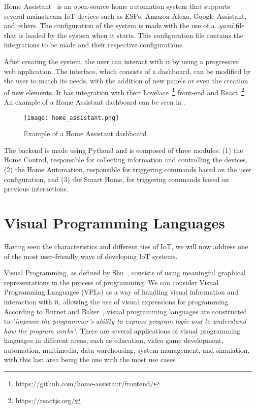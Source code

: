 Home Assistant~\cite{home_assistant} is an open-source home automation system that supports several mainstream IoT devices such as ESPs, Amazon Alexa, Google Assistant, and others. The configuration of the system is made with the use of a \textit{.yaml} file that is loaded by the system when it starts. This configuration file contains the integrations to be made and their respective configurations.

After creating the system, the user can interact with it by using a progressive web application. The interface, which consists of a dashboard, can be modified by the user to match its needs, with the addition of new panels or even the creation of new elements. It has integration with their Lovelace~\footnote{https://github.com/home-assistant/frontend/} front-end and React~\footnote{https://reactjs.org/}. An example of a Home Assistant dashboard can be seen in . 

\begin{figure}[h]
\centering
\texttt{[image: home\_assistant.png]}
\caption[Example of a Home Assistant dashboard]{Example of a Home Assistant dashboard~\cite{homeassistant_image}}
\label{fig:home_assistant}
\end{figure}

The backend is made using Python3 and is composed of three modules: (1) the Home Control, responsible for collecting information and controlling the devices, (2) the Home Automation, responsible for triggering commands based on the user configuration, and (3) the Smart Home, for triggering commands based on previous interactions.



\section{Visual Programming Languages}\label{sec:background_vpl}

Having seen the characteristics and different ties of IoT, we will now address one of the most user-friendly ways of developing IoT systems.

Visual Programming, as defined by Shu~\cite{vpl_definition_shu}, consists of using meaningful graphical representations in the process of programming. We can consider Visual Programming Languages (VPLs) as a way of handling visual information and interaction with it, allowing the use of visual expressions for programming. According to Burnet and Baker~\cite{scaling_vpls}, visual programming languages are constructed to \emph{ "improve the programmer's ability to express program logic and to understand how the program works"}. There are several applications of visual programming languages in different areas, such as education, video game development, automation, multimedia, data warehousing, system management, and simulation, with this last area being the one with the most use cases~\cite{survey_vpl_iot}.


